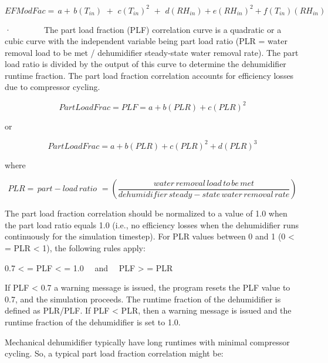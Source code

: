 \begin{equation}
EFModFac = \,a + \,b\left( {{T_{in}}} \right)\,\, + \,\,c{\left( {{T_{in}}} \right)^2}\,\, + \,\,d\left( {R{H_{in}}} \right) + e{(R{H_{in}})^2} + f({T_{in}})(R{H_{in}})
\end{equation}

·~~~~~~~~The part load fraction (PLF) correlation curve is a quadratic or a cubic curve with the independent variable being part load ratio (PLR = water removal load to be met / dehumidifier steady-state water removal rate). The part load ratio is divided by the output of this curve to determine the dehumidifier runtime fraction. The part load fraction correlation accounts for efficiency losses due to compressor cycling.

\begin{equation}
PartLoadFrac = PLF = a + b\left( {PLR} \right) + c{\left( {PLR} \right)^2}
\end{equation}

or

\begin{equation}
PartLoadFrac = a + b\left( {PLR} \right) + c{\left( {PLR} \right)^2} + d{\left( {PLR} \right)^3}
\end{equation}

where

\begin{equation}
PLR = \,part - load\,ratio\,\, = \left( {\frac{{water\,removal\,load\,to\,be\,met}}{{dehumidifier\,steady - state\,water\,removal\,rate}}} \right)
\end{equation}

The part load fraction correlation should be normalized to a value of 1.0 when the part load ratio equals 1.0 (i.e., no efficiency losses when the dehumidifier runs continuously for the simulation timestep). For PLR values between 0 and 1 (0 \textless{} = PLR \textless{} 1), the following rules apply:

0.7 \textless{} = PLF \textless{} = 1.0~~ and~~ PLF \textgreater{} = PLR

If PLF \textless{} 0.7 a warning message is issued, the program resets the PLF value to 0.7, and the simulation proceeds. The runtime fraction of the dehumidifier is defined as PLR/PLF. If PLF \textless{} PLR, then a warning message is issued and the runtime fraction of the dehumidifier is set to 1.0.

Mechanical dehumidifier typically have long runtimes with minimal compressor cycling. So, a typical part load fraction correlation might be:


